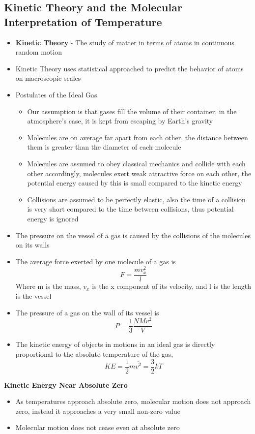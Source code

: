 \subsection{Kinetic Theory and the Molecular Interpretation of Temperature}
\begin{itemize}
    \item \textbf{Kinetic Theory} - The study of matter in terms of atoms in continuous random motion
	\item Kinetic Theory uses statistical approached to predict the behavior of atoms on macroscopic scales
	\item Postulates of the Ideal Gas
	\begin{itemize}
		\item Our assumption is that gases fill the volume of their container, in the atmosphere's case, it is kept from escaping by Earth's gravity
		\item Molecules are on average far apart from each other, the distance between them is greater than the diameter of each molecule
		\item Molecules are assumed to obey classical mechanics and collide with each other accordingly, molecules exert weak attractive force on each other, the potential energy caused by this is small compared to the kinetic energy
		\item Collisions are assumed to be perfectly elastic, also the time of a collision is very short compared to the time between collisions, thus potential energy is ignored
	\end{itemize}
	\item The pressure on the vessel of a gas is caused by the collisions of the molecules on its walls
	\item The average force exerted by one molecule of a gas is \[F=\frac{mv_x^2}{l}\] Where m is the mass, \(v_x\) is the x component of its velocity, and l is the length is the vessel
	\item The pressure of a gas on the wall of its vessel is \[P=\frac{1}{3}\frac{NMv^2}{V}\] 
	\item The kinetic energy of objects in motions in an ideal gas is directly proportional to the absolute temperature of the gas, \[KE=\frac{1}{2}m\overline{v^2}=\frac{3}{2}kT\]
\end{itemize}

\textbf{Kinetic Energy Near Absolute Zero}
\begin{itemize}
    \item As temperatures approach absolute zero, molecular motion does not approach zero, instead it approaches a very small non-zero value
    \item Molecular motion does not cease even at absolute zero
\end{itemize}

